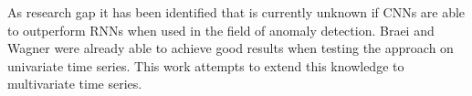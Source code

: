 As research gap it has been identified that is currently unknown if CNNs are able to outperform RNNs when used in the field of anomaly detection. Braei and Wagner \parencite*{Braei2020} were already able to achieve good results when testing the approach on univariate time series. This work attempts to extend this knowledge to multivariate time series.


